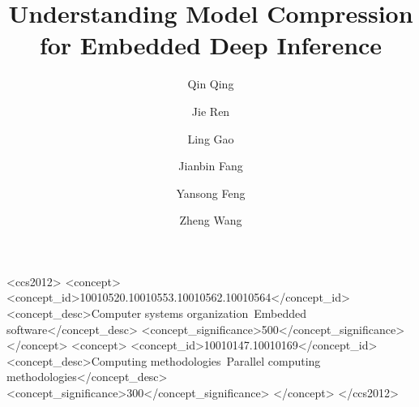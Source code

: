 \documentclass[format=acmsmall, review=true , screen=true]{acmart}
\begin{document}
\title{Understanding Model Compression for Embedded Deep Inference}






\author{Qin Qing}
\author{Jie Ren}
 
\author{Ling Gao}

\author{Jianbin Fang}

\author{Yansong Feng}

\author{Zheng Wang}




%
%
\begin{CCSXML}
<ccs2012> <concept> <concept_id>10010520.10010553.10010562.10010564</concept_id> <concept_desc>Computer systems organization~Embedded
software</concept_desc> <concept_significance>500</concept_significance> </concept> <concept> <concept_id>10010147.10010169</concept_id>
<concept_desc>Computing methodologies~Parallel computing methodologies</concept_desc> <concept_significance>300</concept_significance>
</concept> </ccs2012>
\end{CCSXML}


 


\renewcommand{\shortauthors}{Q. Qing et al.}


\maketitle













\end{document}
